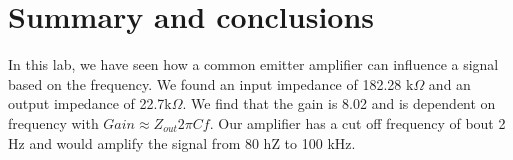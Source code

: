 \documentclass[11pt,letterpaper,onecolumn]{article}
\begin{document}
\section{Summary and conclusions}

In this lab, we have seen how a common emitter amplifier can influence a signal based on the frequency. We found an input impedance of 182.28 k$\Omega$ and an output impedance of 22.7k$\Omega$. We find that the gain is 8.02 and is dependent on frequency with $ Gain \approx Z_{out}2\pi Cf$. Our amplifier has a cut off frequency of bout 2 Hz and would amplify the signal from 80 hZ to 100 kHz.






\end{document}
